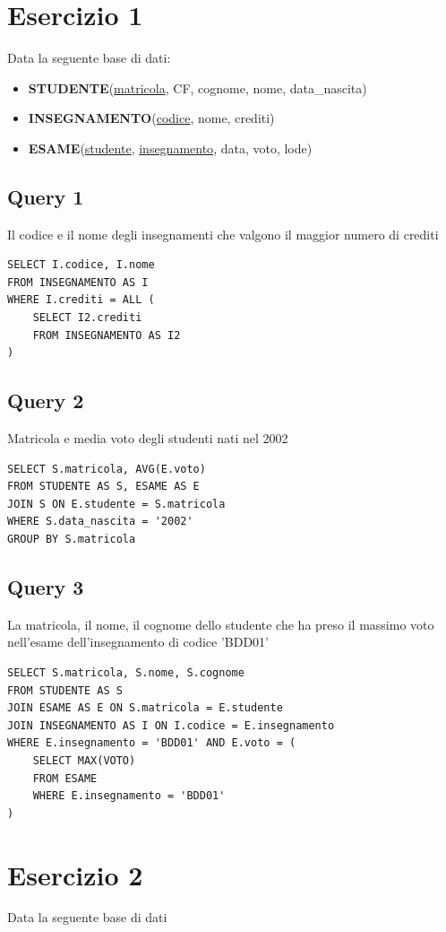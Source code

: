 \section{Esercizio 1}
Data la seguente base di dati:
\begin{itemize}
    \item \textbf{STUDENTE}(\underline{matricola}, CF, cognome, nome, data\_nascita)
    \item \textbf{INSEGNAMENTO}(\underline{codice}, nome, crediti)
    \item \textbf{ESAME}(\underline{studente}, \underline{insegnamento}, data, voto, lode)
\end{itemize}

\subsection{Query 1}
Il codice e il nome degli insegnamenti che valgono il maggior numero di crediti
\begin{lstlisting}
SELECT I.codice, I.nome
FROM INSEGNAMENTO AS I
WHERE I.crediti = ALL (
    SELECT I2.crediti
    FROM INSEGNAMENTO AS I2
)
\end{lstlisting}

\subsection{Query 2}
Matricola e media voto degli studenti nati nel 2002
\begin{lstlisting}
SELECT S.matricola, AVG(E.voto)
FROM STUDENTE AS S, ESAME AS E
JOIN S ON E.studente = S.matricola
WHERE S.data_nascita = '2002'
GROUP BY S.matricola
\end{lstlisting}

\subsection{Query 3}
La matricola, il nome, il cognome dello studente che ha preso il massimo voto nell'esame dell'insegnamento di codice 'BDD01'
\begin{lstlisting}
SELECT S.matricola, S.nome, S.cognome
FROM STUDENTE AS S
JOIN ESAME AS E ON S.matricola = E.studente
JOIN INSEGNAMENTO AS I ON I.codice = E.insegnamento
WHERE E.insegnamento = 'BDD01' AND E.voto = (
    SELECT MAX(VOTO)
    FROM ESAME 
    WHERE E.insegnamento = 'BDD01'
)
\end{lstlisting}

\newpage
\section{Esercizio 2}
Data la seguente base di dati

